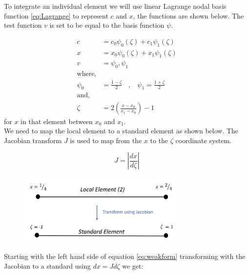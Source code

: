 \documentclass[11pt]{article}
\begin{document}
To integrate an individual element we will use linear Lagrange nodal basis function \ref{eq:Lagrange} to represent $c$ and $x$, the functions are shown below. The test function $v$ is set to be equal to the basis function $\psi$.

\begin{subequations}
\label{eq:Lagrange}
\begin{align}
c &= c_{0}\psi_{0}(\zeta) + c_1\psi_{1}(\zeta) \label{eq:LagrangeC} \\
x &= x_{0}\psi_{0}(\zeta) + x_1\psi_{1}(\zeta) \label{eq:LagrangeX} \\
v & = \psi_{0} , \psi_{1} \label{eq:LagrangeV} \\
\text{where,}\\
\psi_{0} &= \frac{1 - \zeta}{2} \ \ \ \ ,  \ \ \ \ \psi_{1} = \frac{1 + \zeta}{2} \label{eq:LagrangePSI}\\
\text{and,}\\
\zeta  & = 2 \left(\frac{x - x_0}{x_1 - x_0}\right) - 1 \label{eq:LagrangeZeta}
\end{align}
\end{subequations}
for $x$ in that element between $x_0$ and $x_1$.\\
We need to map the local element to a standard element as shown below. The Jacobian transform $J$ is used to map from the $x$ to the $\zeta$ coordinate system.

\begin{equation} \label{eq:Jacobian}
J = \left \vert \frac{dx}{d\zeta}\right \vert
\end{equation}



\begin{figure}[h!]
\centering
\includegraphics[width=0.75\textwidth]{Local2Standard.PNG}
\end{figure}

Starting with the left hand side of equation \ref{eq:weakform} transforming with the Jacobian to a standard using $dx = Jd\zeta$ we get:
\end{document}
